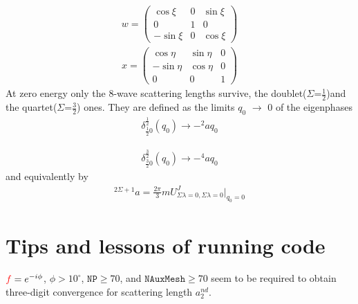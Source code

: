 \documentclass[11pt,aps]{revtex4}
\newcommand{\PF}{{\color{red}f}}
\begin{document}
\begin{equation}
\begin{split}
w=
\begin{pmatrix}
\cos \xi & 0 & \sin \xi\\
0 & 1 & 0\\
-\sin \xi & 0 & \cos \xi
\end{pmatrix}
\end{split}
\end{equation}
\begin{equation}
\begin{split}
x=
\begin{pmatrix}
\cos \eta & \sin \eta & 0\\
-\sin \eta & \cos \eta & 0\\
0 & 0 & 1
\end{pmatrix}
\end{split}
\end{equation}
At zero energy only the 8-wave scattering lengths survive, the doublet($\Sigma$=$\frac1 2$)and the quartet($\Sigma$=$\frac3 2$) ones. They are defined as the limits $q_0$ $\rightarrow$ 0 of the eigenphases
\begin{equation}
\begin{split}
\delta^{\frac 1 2}_{\frac 1 2 0}(q_0)\rightarrow -^2 aq_0
\end{split}
\end{equation}

\begin{equation}
\begin{split}
\delta^{\frac 3 2}_{\frac 3 2 0}(q_0)\rightarrow -^4 aq_0
\end{split}
\end{equation}
and equivalently by
\begin{equation}
\begin{split}
^{2\Sigma+1}a=\frac {2\pi} 3{} mU^{J}_{\Sigma \lambda=0,\Sigma \lambda=0}|_{q_0=0}
\end{split}
\end{equation}

\section{Tips and lessons of running code}

$\PF = e^{-i\phi}$, $\phi > 10^\circ$, $\texttt{NP} \geqslant 70$, and $\texttt{NAuxMesh} \geqslant 70$ seem to be required to obtain three-digit convergence for scattering length $a_2^{nd}$.
\end{document}
